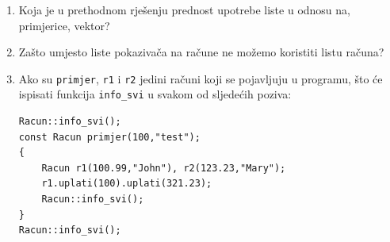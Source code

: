 \begin{razmisljanje}
\begin{enumerate}
    \item
    Koja je u prethodnom rješenju prednost upotrebe liste u odnosu na, primjerice, vektor?
    \item
    Zašto umjesto liste pokazivača na račune ne možemo koristiti listu računa?
    \item 
    Ako su \texttt{primjer}, \texttt{r1} i \texttt{r2}
    jedini računi koji se pojavljuju u programu,
    što će ispisati funkcija \texttt{info\_svi} u svakom od sljedećih poziva:

    \begin{verbatim}
Racun::info_svi();
const Racun primjer(100,"test");
{
    Racun r1(100.99,"John"), r2(123.23,"Mary");
    r1.uplati(100).uplati(321.23);
    Racun::info_svi();
}
Racun::info_svi();
    \end{verbatim}
\end{enumerate}
\end{razmisljanje}